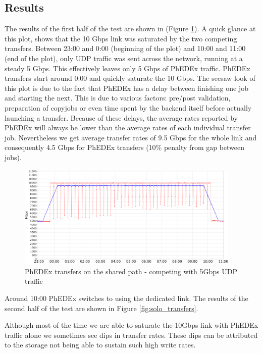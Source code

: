 \subsection{Results}

The results of the first half of the test are shown in  (Figure \ref{fig:shared_transfers}).
A quick glance at this plot, shows that the 10 Gbps link was saturated by the two
competing transfers. Between 23:00 and 0:00 (beginning of the plot) and 
10:00 and 11:00 (end of the plot), only UDP traffic was sent across the network, 
running at a steady 5 Gbps. This effectively leaves only 5 Gbps of PhEDEx traffic.
PhEDEx transfers start around 0:00 and quickly saturate the 10 Gbps. 
The seesaw look of this plot is due to the fact that PhEDEx has a delay
between finishing one job and starting the next. This is due to various factors:
 pre/post validation, preparation of copyjobs or even time spent by the backend itself 
 before actually launching a transfer. Because of these delays, the average 
 rates reported by PhEDEx will always be lower than the average rates of each
 individual transfer job. Nevertheless we get average transfer rates of 9.5 Gbps for the
 whole link and consequently 4.5 Gbps for PhEDEx transfers (10\% penalty from
 gap between jobs).

\begin{figure}[h]
  \centering
  \includegraphics[width=0.95\textwidth]{Figures/FileDownload_Shared_path.png}
  \caption{PhEDEx transfers on the shared path - competing with 5Gbps UDP traffic}
  \label{fig:shared_transfers}
\end{figure} 

Around 10:00 PhEDEx switches to using the dedicated link. The results of the 
second half of the test are shown in Figure \ref{fig:solo_transfers}.

Although most of the time we are able to saturate the 10Gbps link with PhEDEx 
traffic alone we sometimes see dips in transfer rates. These dips can be attributed 
to the storage not being able to sustain such high write rates.

